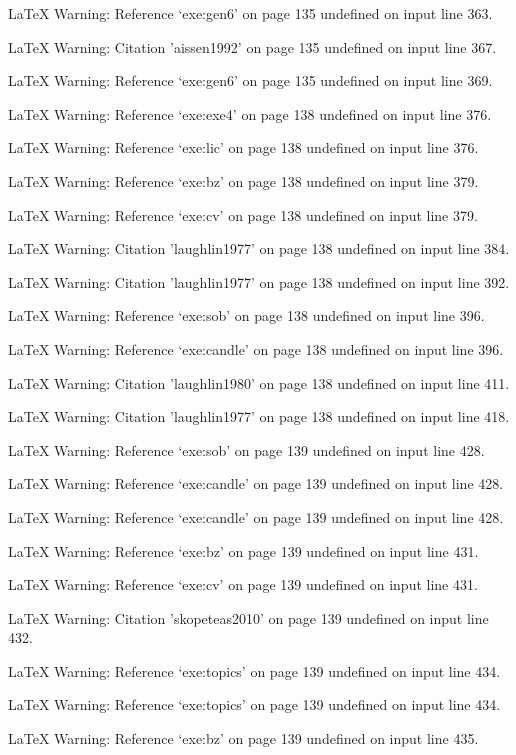 LaTeX Warning: Reference `exe:gen6' on page 135 undefined on input line 363.


LaTeX Warning: Citation 'aissen1992' on page 135 undefined on input line 367.


LaTeX Warning: Reference `exe:gen6' on page 135 undefined on input line 369.


LaTeX Warning: Reference `exe:exe4' on page 138 undefined on input line 376.


LaTeX Warning: Reference `exe:lic' on page 138 undefined on input line 376.


LaTeX Warning: Reference `exe:bz' on page 138 undefined on input line 379.


LaTeX Warning: Reference `exe:cv' on page 138 undefined on input line 379.


LaTeX Warning: Citation 'laughlin1977' on page 138 undefined on input line 384.


LaTeX Warning: Citation 'laughlin1977' on page 138 undefined on input line 392.


LaTeX Warning: Reference `exe:sob' on page 138 undefined on input line 396.


LaTeX Warning: Reference `exe:candle' on page 138 undefined on input line 396.


LaTeX Warning: Citation 'laughlin1980' on page 138 undefined on input line 411.


LaTeX Warning: Citation 'laughlin1977' on page 138 undefined on input line 418.


LaTeX Warning: Reference `exe:sob' on page 139 undefined on input line 428.


LaTeX Warning: Reference `exe:candle' on page 139 undefined on input line 428.


LaTeX Warning: Reference `exe:candle' on page 139 undefined on input line 428.


LaTeX Warning: Reference `exe:bz' on page 139 undefined on input line 431.


LaTeX Warning: Reference `exe:cv' on page 139 undefined on input line 431.


LaTeX Warning: Citation 'skopeteas2010' on page 139 undefined on input line 432.


LaTeX Warning: Reference `exe:topics' on page 139 undefined on input line 434.


LaTeX Warning: Reference `exe:topics' on page 139 undefined on input line 434.


LaTeX Warning: Reference `exe:bz' on page 139 undefined on input line 435.


